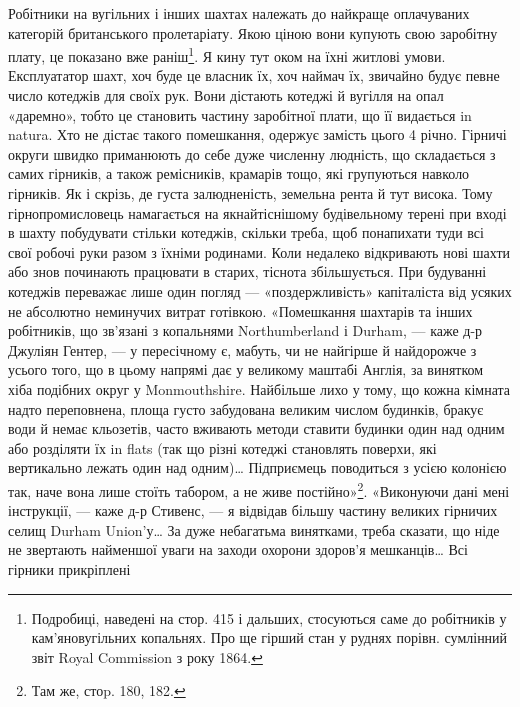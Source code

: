 Робітники на вугільних і інших шахтах належать до найкраще
оплачуваних категорій британського пролетаріату. Якою ціною
вони купують свою заробітну плату, це показано вже раніш\footnote{
Подробиці, наведені на стор. 415 і дальших, стосуються саме до
робітників у кам'яновугільних копальнях. Про ще гірший стан у руднях
порівн. сумлінний звіт Royal Commission з року 1864.
}.
Я кину тут оком на їхні житлові умови. Експлуататор шахт,
хоч буде це власник їх, хоч наймач їх, звичайно будує певне
число котеджів для своїх рук. Вони дістають котеджі й вугілля
на опал «даремно», тобто це становить частину заробітної плати,
що її видається in natura. Хто не дістає такого помешкання,
одержує замість цього 4 річно. Гірничі округи
швидко приманюють до себе дуже численну людність, що складається
з самих гірників, а також ремісників, крамарів тощо,
які групуються навколо гірників. Як і скрізь, де густа залюдненість,
земельна рента й тут висока. Тому гірнопромисловець
намагається на якнайтіснішому будівельному терені при вході
в шахту побудувати стільки котеджів, скільки треба, щоб понапихати
туди всі свої робочі руки разом з їхніми родинами.
Коли недалеко відкривають нові шахти або знов починають
працювати в старих, тіснота збільшується. При будуванні котеджів
переважає лише один погляд — «поздержливість» капіталіста
від усяких не абсолютно неминучих витрат готівкою.
«Помешкання шахтарів та інших робітників, що зв’язані з копальнями
Northumberland і Durham, — каже д-р Джуліян Гентер,
— у пересічному є, мабуть, чи не найгірше й найдорожче
з усього того, що в цьому напрямі дає у великому маштабі
Англія, за винятком хіба подібних округ у Monmouthshire. Найбільше
лихо у тому, що кожна кімната надто переповнена, площа
густо забудована великим числом будинків, бракує води й
немає кльозетів, часто вживають методи ставити будинки один
над одним або розділяти їх in flats (так що різні котеджі становлять
поверхи, які вертикально лежать один над одним)\dots{} Підприємець
поводиться з усією колонією так, наче вона лише стоїть
табором, а не живе постійно»\footnote{
Там же, стоp. 180, 182.
}. «Виконуючи дані мені інструкції,
— каже д-р Стивенс, — я відвідав більшу частину великих
гірничих селищ Durham Union’у\dots{} За дуже небагатьма винятками,
треба сказати, що ніде не звертають найменшої уваги на
заходи охорони здоров’я мешканців\dots{} Всі гірники прикріплені
\parbreak{}  %
